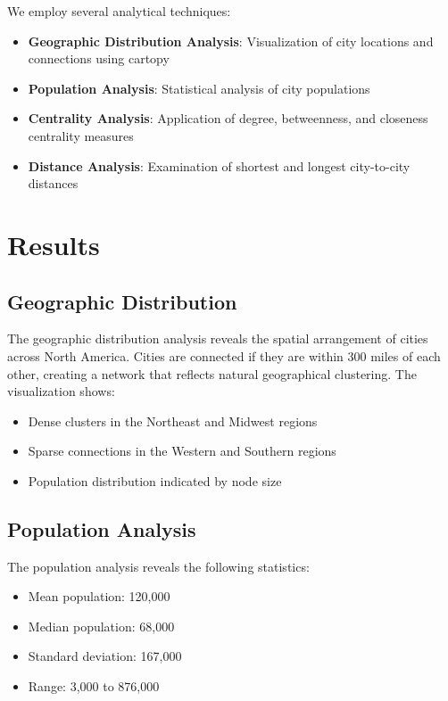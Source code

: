 \documentclass{article}
\begin{document}
We employ several analytical techniques:

\begin{itemize}
    \item \textbf{Geographic Distribution Analysis}: Visualization of city locations and connections using cartopy
    \item \textbf{Population Analysis}: Statistical analysis of city populations
    \item \textbf{Centrality Analysis}: Application of degree, betweenness, and closeness centrality measures
    \item \textbf{Distance Analysis}: Examination of shortest and longest city-to-city distances
\end{itemize}

\section{Results}

\subsection{Geographic Distribution}

The geographic distribution analysis reveals the spatial arrangement of cities across North America. Cities are connected if they are within 300 miles of each other, creating a network that reflects natural geographical clustering. The visualization shows:

\begin{itemize}
    \item Dense clusters in the Northeast and Midwest regions
    \item Sparse connections in the Western and Southern regions
    \item Population distribution indicated by node size
\end{itemize}

\subsection{Population Analysis}

The population analysis reveals the following statistics:
\begin{itemize}
    \item Mean population: 120,000
    \item Median population: 68,000
    \item Standard deviation: 167,000
    \item Range: 3,000 to 876,000
\end{itemize}
\end{document}
